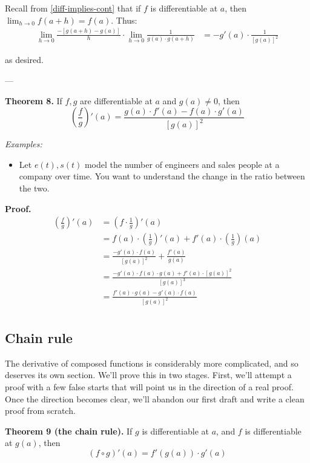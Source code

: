 Recall from \ref{diff-implies-cont} that if $f$ is differentiable at
$a$, then $\lim_{h\to0}f(a+h)=f(a)$. Thus:
\begin{align*}
  \lim_{h\to0}\frac{-[g(a+h)-g(a)]}{h}\cdot\lim_{h\to0}\frac{1}{g(a)\cdot g(a+h)}
  &=-g'(a)\cdot \frac{1}{[g(a)]^2}
\end{align*}

as desired.

\vs---\vs

\textbf{Theorem 8.} If $f, g$ are differentiable at $a$ and $g(a)\neq0$, then
\[\left(\frac{f}{g}\right)'(a)=\frac{g(a)\cdot f'(a)-f(a)\cdot g'(a)}{[g(a)]^2}\]

\vs

\textit{Examples:}
\begin{itemize}
\item Let $e(t), s(t)$ model the number of engineers and sales people
  at a company over time. You want to understand the change in the
  ratio between the two.
\end{itemize}

\textbf{Proof.}
\begin{align*}
  \left(\frac{f}{g}\right)'(a)&=\left(f\cdot\frac{1}{g}\right)'(a)\\
  &=f(a)\cdot
    \left(\frac{1}{g}\right)'(a)+f'(a)\cdot\left(\frac{1}{g}\right)(a)\\
  &=\frac{-g'(a)\cdot f(a)}{[g(a)]^2}+\frac{f'(a)}{g(a)}\\
  &=\frac{-g'(a)\cdot f(a)\cdot g(a)+f'(a)\cdot [g(a)]^2}{[g(a)]^3}\\
  &=\frac{f'(a)\cdot g(a)-g'(a)\cdot f(a)}{[g(a)]^2}\\
\end{align*}

\subsection{Chain rule}
The derivative of composed functions is considerably more complicated,
and so deserves its own section. We'll prove this in two stages.
First, we'll attempt a proof with a few false starts that will point
us in the direction of a real proof. Once the direction becomes clear,
we'll abandon our first draft and write a clean proof from scratch.

\vs

\textbf{Theorem 9 (the chain rule).} If $g$ is differentiable at $a$,
and $f$ is differentiable at $g(a)$, then
\[(f\circ g)'(a)=f'(g(a))\cdot g'(a)\]

